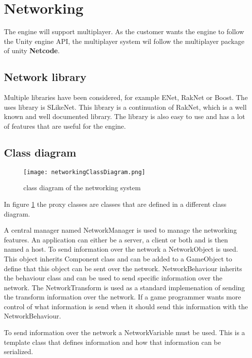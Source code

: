\section{Networking}
The engine will support multiplayer.
As the customer wants the engine to follow the Unity engine API, the multiplayer system wil follow the multiplayer package of unity \textbf{Netcode}.

\subsection{Network library}
Multiple libraries have been considered, for example ENet, RakNet or Boost.
The uses library is SLikeNet. This library is a continuation of RakNet, which is a well known and well documented library.
The library is also easy to use and has a lot of features that are useful for the engine.

\subsection{Class diagram}

\begin{figure}[H]
    \centering
    \texttt{[image: networkingClassDiagram.png]}
    \caption{class diagram of the networking system}
    \label{fig:networkingClassDiagram}
\end{figure}
In figure \ref{fig:networkingClassDiagram} the proxy classes are classes that are defined in a different class diagram.

A central manager named NetworkManager is used to manage the networking features.
An application can either be a server, a client or both and is then named a host.
To send information over the network a NetworkObject is used.
This object inherits Component class and can be added to a GameObject to define that this object can be sent over the network.
NetworkBehaviour inherits the behaviour class and can be used to send specific information over the network.
The NetworkTransform is used as a standard implemenation of sending the transform information over the network.
If a game programmer wants more control of what information is send when it should send this information with the NetworkBehaviour.

To send information over the network a NetworkVariable must be used.
This is a template class that defines information and how that information can be serialized.
